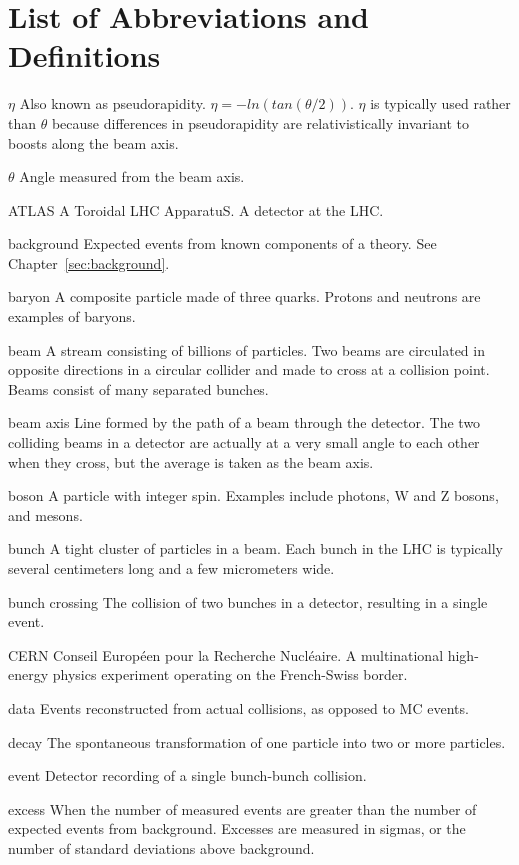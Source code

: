 \chapter*{List of Abbreviations and Definitions}

\begin{symbollist*}
\item[$\eta$] Also known as pseudorapidity. $\eta=-ln(tan(\theta/2))$. $\eta$ is typically used rather than $\theta$ because differences in pseudorapidity are relativistically invariant to boosts along the beam axis.
\item[$\theta$] Angle measured from the beam axis.
\item[ATLAS] A Toroidal LHC ApparatuS. A detector at the LHC.
\item[background] Expected events from known components of a theory. See Chapter~\ref{sec:background}.
\item[baryon] A composite particle made of three quarks. Protons and neutrons are examples of baryons.
\item[beam] A stream consisting of billions of particles. Two beams are circulated in opposite directions in a circular collider and made to cross at a collision point. Beams consist of many separated bunches.
\item[beam axis] Line formed by the path of a beam through the detector. The two colliding beams in a detector are actually at a very small angle to each other when they cross, but the average is taken as the beam axis.
\item[boson] A particle with integer spin. Examples include photons, W and Z bosons, and mesons.
\item[bunch] A tight cluster of particles in a beam. Each bunch in the LHC is typically several centimeters long and a few micrometers wide.
\item[bunch crossing] The collision of two bunches in a detector, resulting in a single event.
\item[CERN] Conseil Européen pour la Recherche Nucléaire. A multinational high-energy physics experiment operating on the French-Swiss border.
\item[data] Events reconstructed from actual collisions, as opposed to MC events.
\item[decay] The spontaneous transformation of one particle into two or more particles.	
\item[event] Detector recording of a single bunch-bunch collision.
\item[excess] When the number of measured events are greater than the number of expected events from background. Excesses are measured in sigmas, or the number of standard deviations above background.

\end{symbollist*}
